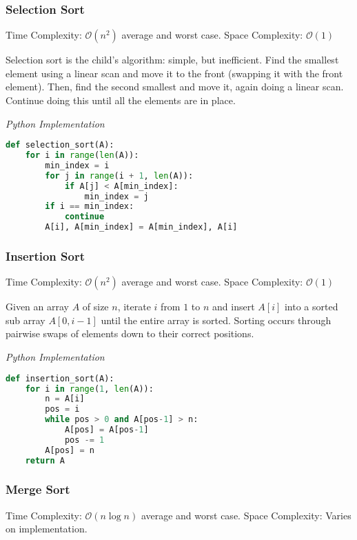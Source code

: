 \documentclass{article}
\newcommand{\bigO}{\ensuremath{\mathcal{O}}}
\begin{document}
    \subsubsection{Selection Sort}
    Time Complexity: $\bigO(n^2)$ average and worst case. Space Complexity: $\bigO (1)$
    
    Selection sort is the child's algorithm: simple, but inefficient. Find the smallest element using a linear scan and move it to the front (swapping it with the front element). Then, find the second smallest and move it, again doing a linear scan. Continue doing this until all the elements are in place. 

\vspace{8pt} \emph{Python Implementation}
\begin{lstlisting}[language=Python]
def selection_sort(A):
    for i in range(len(A)):
        min_index = i
        for j in range(i + 1, len(A)):
            if A[j] < A[min_index]:
                min_index = j
        if i == min_index:
            continue
        A[i], A[min_index] = A[min_index], A[i]
\end{lstlisting}
    
    \subsubsection{Insertion Sort}
    Time Complexity: $\bigO(n^2)$ average and worst case. Space Complexity: $\bigO(1)$
    
    Given an array $A$ of size $n$, iterate $i$ from $1$ to $n$ and insert $A[i]$ into a sorted sub array $A[0, i-1]$ until the entire array is sorted. Sorting occurs through pairwise swaps of elements down to their correct positions.

\vspace{8pt} \emph{Python Implementation}
\begin{lstlisting}[language=Python]
def insertion_sort(A):
    for i in range(1, len(A)):
        n = A[i]
        pos = i
        while pos > 0 and A[pos-1] > n:
            A[pos] = A[pos-1]
            pos -= 1
        A[pos] = n
    return A
\end{lstlisting}

    \subsubsection{Merge Sort}
    Time Complexity: $\bigO( n \log n )$ average and worst case. Space Complexity: Varies on implementation. 
    
\end{document}
